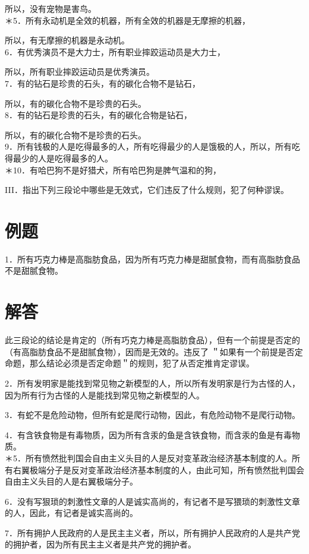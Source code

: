 所以，没有宠物是害鸟。\\
＊5．所有永动机是全效的机器，所有全效的机器是无摩擦的机器，

所以，有无摩擦的机器是永动机。\\
6．有优秀演员不是大力士，所有职业摔跤运动员是大力士，

所以，所有职业摔跤运动员是优秀演员。\\
7．有的钻石是珍贵的石头，有的碳化合物不是钻石，

所以，有的碳化合物不是珍贵的石头。\\
8．有的钻石是珍贵的石头，有的碳化合物是钻石，

所以，有的碳化合物不是珍贵的石头。\\
9．所有钱极的人是吃得最多的人，所有吃得最少的人是饿极的人，所以，所有吃得最少的人是吃得最多的人。\\
＊10．有哈巴狗不是好猎犬，所有哈巴狗是脾气温和的狗，

III．指出下列三段论中哪些是无效式，它们违反了什么规则，犯了何种谬误。

\section*{例题}
1．所有巧克力棒是高脂肪食品，因为所有巧克力棒是甜腻食物，而有高脂肪食品不是甜腻食物。

\section*{解答}
此三段论的结论是肯定的（所有巧克力棒是高脂肪食品），但有一个前提是否定的（有高脂肪食品不是甜腻食物），因而是无效的。违反了 ＂如果有一个前提是否定命题，那么结论必须是否定命题＂的规则，犯了从否定推肯定谬误。

2．所有发明家是能找到常见物之新模型的人，所以所有发明家是行为古怪的人，因为所有行为古怪的人是能找到常见物之新模型的人。

3．有蛇不是危险动物，但所有蛇是爬行动物，因此，有危险动物不是爬行动物。

4．有含铁食物是有毒物质，因为所有含汞的鱼是含铁食物，而含汞的鱼是有毒物质。\\
＊5．所有愤然批判国会自由主义头目的人是反对变革政治经济基本制度的人。所有右翼极端分子是反对变革政治经济基本制度的人，由此可知，所有愤然批判国会自由主义头目的人是右翼极端分子。

6．没有写狠琐的刺激性文章的人是诚实高尚的，有记者不是写猥琐的刺激性文章的人，因此，有记者是诚实高尚的。

7．所有拥护人民政府的人是民主主义者，所以，所有拥护人民政府的人是共产党的拥护者，因为所有民主主义者是共产党的拥护者。

